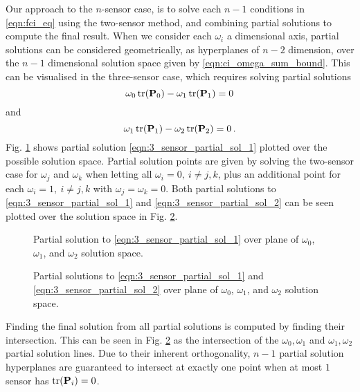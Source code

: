 \documentclass[letterpaper, 10 pt, conference]{ieeeconf}  %
\begin{document}
Our approach to the $n$-sensor case, is to solve each $n-1$ conditions in \eqref{eqn:fci_eq} using the two-sensor method, and combining partial solutions to compute the final result. When we consider each $\omega_i$ a dimensional axis, partial solutions can be considered geometrically, as hyperplanes of $n-2$ dimension, over the $n-1$ dimensional solution space given by \eqref{eqn:ci_omega_sum_bound}. This can be visualised in the three-sensor case, which requires solving partial solutions
\begin{equation}
   \omega_0 \operatorname{tr}({{\mathbf{P}}}_0) - \omega_1 \operatorname{tr}({{\mathbf{P}}}_1) = 0 \label{eqn:3_sensor_partial_sol_1}
\end{equation}
and
\begin{equation}
   \omega_1 \operatorname{tr}({{\mathbf{P}}}_1) - \omega_2 \operatorname{tr}({{\mathbf{P}}}_2) = 0\,. \label{eqn:3_sensor_partial_sol_2}
\end{equation}
Fig. \ref{fig:3_sensor_partial_sol} shows partial solution \eqref{eqn:3_sensor_partial_sol_1} plotted over the possible solution space. Partial solution points are given by solving the two-sensor case for $\omega_j$ and $\omega_k$ when letting all $\omega_i=0,\ i\neq j,k$, plus an additional point for each $\omega_i=1,\ i\neq j,k$ with $\omega_j=\omega_k=0$. Both partial solutions to \eqref{eqn:3_sensor_partial_sol_1} and \eqref{eqn:3_sensor_partial_sol_2} can be seen plotted over the solution space in Fig. \ref{fig:3_sensor_partial_sols}.
\begin{figure}[tb]
   \vspace{-30pt}
   \begin{center}
      
   \end{center}
   \vspace{-10pt}
   \caption{Partial solution to \eqref{eqn:3_sensor_partial_sol_1} over plane of $\omega_0$, $\omega_1$, and $\omega_2$ solution space.}
   \label{fig:3_sensor_partial_sol}
\end{figure}
\begin{figure}[tb]
   \vspace{-30pt}
   \begin{center}
      
   \end{center}
   \vspace{-10pt}
   \caption{Partial solutions to \eqref{eqn:3_sensor_partial_sol_1} and \eqref{eqn:3_sensor_partial_sol_2} over plane of $\omega_0$, $\omega_1$, and $\omega_2$ solution space.}
   \label{fig:3_sensor_partial_sols}
\end{figure}
Finding the final solution from all partial solutions is computed by finding their intersection. This can be seen in Fig. \ref{fig:3_sensor_partial_sols} as the intersection of the $\omega_0,\omega_1$ and $\omega_1,\omega_2$ partial solution lines. Due to their inherent orthogonality, $n-1$ partial solution hyperplanes are guaranteed to intersect at exactly one point when at most $1$ sensor has $\operatorname{tr}({{\mathbf{P}}}_i)=0$.
\end{document}
